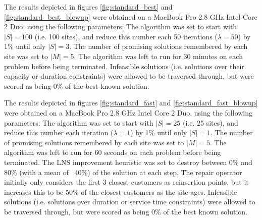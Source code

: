 
The results depicted in figures \ref{fig:standard_best} and \ref{fig:standard_best_blowup} were obtained on a MacBook Pro 2.8 GHz Intel Core 2 Duo, using the following parameters: The algorithm was set to start with $|S| = 100$ (i.e. 100 sites), and reduce this number each 50 iterations ($\lambda = 50$) by 1\% until only $|S| = 3$. The number of promising solutions remembered by each site was set to $|M| = 5$. The algorithm was left to run for 30 minutes on each problem before being terminated. Infeasible solutions (i.e. solutions over their capacity or duration constraints) were allowed to be traversed through, but were scored as being 0\% of the best known solution.




The results depicted in figures \ref{fig:standard_fast} and \ref{fig:standard_fast_blowup} were obtained on a MacBook Pro 2.8 GHz Intel Core 2 Duo, using the following parameters: The algorithm was set to start with $|S| = 25$ (i.e. 25 sites), and reduce this number each iteration ($\lambda = 1$) by 1\% until only $|S| = 1$. The number of promising solutions remembered by each site was set to $|M| = 5$. The algorithm was left to run for 60 seconds on each problem before being terminated. The LNS improvement heuristic was set to destroy between 0\% and 80\% (with a mean of ~40\%) of the solution at each step. The repair operator initially only considers the first 3 closest customers as reinsertion points, but it increases this to be 50\% of the closest customers as the site ages. Infeasible solutions (i.e. solutions over duration or service time constraints) were allowed to be traversed through, but were scored as being 0\% of the best known solution.

